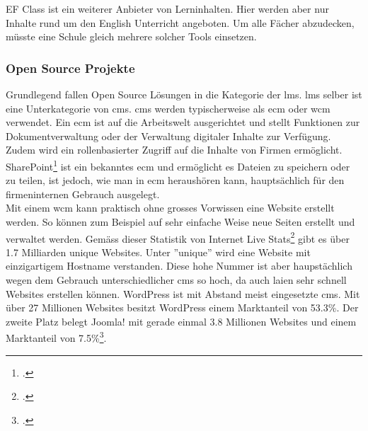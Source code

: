 EF Class ist ein weiterer Anbieter von Lerninhalten. Hier werden aber nur Inhalte rund um den English Unterricht angeboten. Um alle Fächer abzudecken, müsste eine Schule gleich mehrere solcher Tools einsetzen. \\


\subsubsection*{Open Source Projekte}
Grundlegend fallen Open Source Lösungen in die Kategorie der \gls{lms}. \gls{lms} selber ist eine Unterkategorie von \gls{cms}. \gls{cms} werden typischerweise als \gls{ecm} oder \gls{wcm} verwendet. Ein \gls{ecm} ist auf die Arbeitswelt ausgerichtet und stellt Funktionen zur Dokumentverwaltung oder der Verwaltung digitaler Inhalte zur Verfügung. Zudem wird ein rollenbasierter Zugriff auf die Inhalte von Firmen ermöglicht. SharePoint\footcite{sharepoint} ist ein bekanntes \gls{ecm} und ermöglicht es Dateien zu speichern oder zu teilen, ist jedoch, wie man in \gls{ecm} heraushören kann, hauptsächlich für den firmeninternen Gebrauch ausgelegt. \\

Mit einem \gls{wcm} kann praktisch ohne grosses Vorwissen eine Website erstellt werden. So können zum Beispiel auf sehr einfache Weise neue Seiten erstellt und verwaltet werden. Gemäss dieser Statistik von Internet Live Stats\footcite{internet_live_stats} gibt es über 1.7 Milliarden unique Websites. Unter ''unique'' wird eine Website mit einzigartigem Hostname verstanden. Diese hohe Nummer ist aber haupstächlich wegen dem Gebrauch unterschiedlicher \gls{cms} so hoch, da auch laien sehr schnell Websites erstellen können. WordPress ist mit Abstand meist eingesetzte \gls{cms}. Mit über 27 Millionen Websites besitzt WordPress einem Marktanteil von 53.3\%. Der zweite Platz belegt Joomla! mit gerade einmal 3.8 Millionen Websites und einem Marktanteil von 7.5\%\footcite{cms_market_share}.\\

